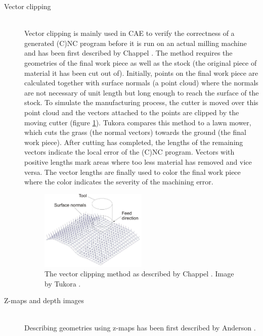 \begin{description}
	\item[Vector clipping] \hfill \\
	Vector clipping is mainly used in CAE to verify the correctness of a generated (C)NC program before it is run on an actual milling machine and has been first described by Chappel \cite{vector_clipping}.
	The method requires the geometries of the final work piece as well as the stock (\ie the original piece of material it has been cut out of).
	Initially, points on the final work piece are calculated together with surface normals (\ie a point cloud) where the normals are not necessary of unit length but long enough to reach the surface of the stock.
	To simulate the manufacturing process, the cutter is moved over this point cloud and the vectors attached to the points are clipped by the moving cutter (\cf figure \ref{fig:vector_clipping}).
	Tukora compares this method to a lawn mower, which cuts the grass (\ie the normal vectors) towards the ground (\ie the final work piece).
	After cutting has completed, the lengths of the remaining vectors indicate the local error of the (C)NC program.
	Vectors with positive lengths mark areas where too less material has removed and vice versa.
	The vector lengths are finally used to color the final work piece where the color indicates the severity of the machining error. 
	
	\begin{figure}[h]
		\centering
		\includegraphics[width=0.5\textwidth]{images/vector_clipping}
		\caption{The vector clipping method as described by Chappel \cite{vector_clipping}. Image by Tukora \cite{virtual_machining_review}.}
		\label{fig:vector_clipping}
	\end{figure}
	 
	\item[Z-maps and depth images] \hfill \\
	Describing geometries using z-maps has been first described by Anderson \cite{zmap}.
	

\end{description}
